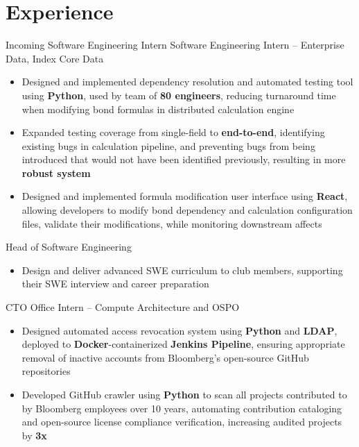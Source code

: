 \documentclass[letterpaper,11pt]{article}
\begin{document}
\section{Experience}
{Incoming Software Engineering Intern}{}
{Software Engineering Intern -- Enterprise Data, Index Core Data}{}
\begin{itemize}
  \item Designed and implemented dependency resolution and automated testing
        tool using \textbf{Python}, used by team of \textbf{80 engineers},
        reducing turnaround time when modifying bond formulas in distributed
        calculation engine
  \item Expanded testing coverage from single-field to \textbf{end-to-end}, identifying
        existing bugs in calculation pipeline, and preventing bugs from being
        introduced that would not have been identified previously, resulting in
        more \textbf{robust system}
  \item Designed and implemented formula modification user interface using
        \textbf{React}, allowing developers to modify bond dependency and
        calculation configuration files, validate their modifications, while
        monitoring downstream affects
\end{itemize}
{Head of Software Engineering}{}
\begin{itemize}
  \item Design and deliver advanced SWE curriculum to club members, supporting
        their SWE interview and career preparation
\end{itemize}
{CTO Office Intern -- Compute Architecture and OSPO}{}
\begin{itemize}
  \item Designed automated access revocation system using \textbf{Python} and
        \textbf{LDAP}, deployed to \textbf{Docker}-containerized
        \textbf{Jenkins Pipeline}, ensuring appropriate removal of inactive
        accounts from Bloomberg's open-source GitHub repositories
  \item Developed GitHub crawler using \textbf{Python} to scan all projects
        contributed to by Bloomberg employees over 10 years, automating
        contribution cataloging and open-source license compliance
        verification, increasing audited projects by \textbf{3x}
\end{itemize}
\end{document}
